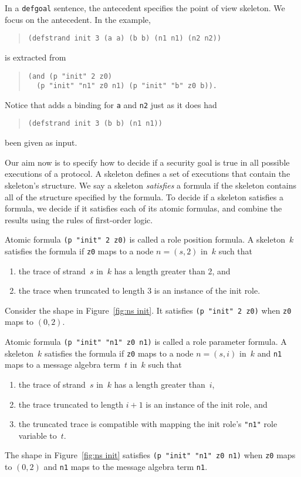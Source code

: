 \documentclass[12pt]{article}
\begin{document}
In a \texttt{defgoal} sentence, the antecedent specifies the point of
view skeleton.  We focus on the antecedent.  In the example,

\begin{quote}
\begin{verbatim}
(defstrand init 3 (a a) (b b) (n1 n1) (n2 n2))
\end{verbatim}
\end{quote}
is extracted from
\begin{quote}
\begin{verbatim}
(and (p "init" 2 z0)
  (p "init" "n1" z0 n1) (p "init" "b" z0 b)).
\end{verbatim}
\end{quote}
Notice that {\cpsa} adds a binding for \texttt{a} and \texttt{n2} just
as it does had
\begin{quote}
\begin{verbatim}
(defstrand init 3 (b b) (n1 n1))
\end{verbatim}
\end{quote}
been given as input.

Our aim now is to specify how to decide if a security goal is true in
all possible executions of a protocol.  A skeleton defines a set of
executions that contain the skeleton's structure.  We say a skeleton
\emph{satisfies} a formula if the skeleton contains all of the
structure specified by the formula.  To decide if a skeleton
satisfies a formula, we decide if it satisfies each of its atomic
formulas, and combine the results using the rules of first-order
logic.

Atomic formula \texttt{(p "init" 2 z0)} is called a role position
formula.  A skeleton~$k$ satisfies the formula if \texttt{z0} maps to
a node $n=(s,2)$ in~$k$ such that
\begin{enumerate}
\item the trace of strand~$s$ in~$k$ has a length greater than 2, and
\item the trace when truncated to length 3 is an instance of the init
  role.
\end{enumerate}
Consider the shape in Figure~\ref{fig:ns init}.  It satisfies
\texttt{(p "init" 2 z0)} when \texttt{z0} maps to $(0,2)$.

Atomic formula \texttt{(p "init" "n1" z0 n1)} is called a role
parameter formula.  A skeleton~$k$ satisfies the formula if
\texttt{z0} maps to a node $n=(s,i)$ in~$k$ and \texttt{n1} maps to a
message algebra term~$t$ in~$k$ such that
\begin{enumerate}
\item the trace of strand~$s$ in~$k$ has a length greater than~$i$,
\item the trace truncated to length $i+1$ is an instance of the
  init role, and
\item the truncated trace is compatible with mapping the init role's
  \texttt{"n1"} role variable to~$t$.
\end{enumerate}
The shape in Figure~\ref{fig:ns init} satisfies \texttt{(p "init" "n1"
  z0 n1)} when \texttt{z0} maps to $(0,2)$ and \texttt{n1} maps to the
message algebra term \texttt{n1}.
\end{document}
